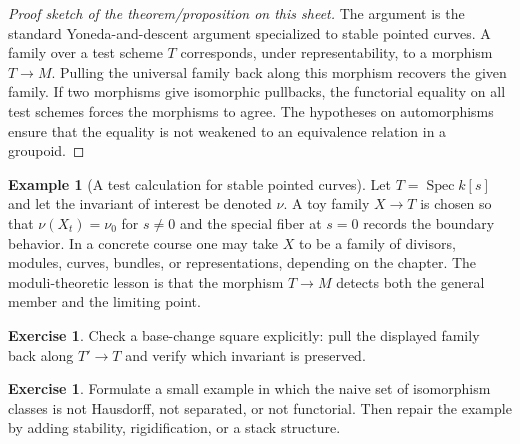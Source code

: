\documentclass[11pt]{amsart}
\theoremstyle{definition}
\newtheorem{example}[theorem]{Example}
\newtheorem{exercise}[theorem]{Exercise}
\newcommand{\Spec}{\operatorname{Spec}}
\begin{document}
\begin{proof}[Proof sketch of the theorem/proposition on this sheet]
The argument is the standard Yoneda-and-descent argument specialized to stable pointed curves.  A family over a test scheme $T$ corresponds, under representability, to a morphism $T\to M$.  Pulling the universal family back along this morphism recovers the given family.  If two morphisms give isomorphic pullbacks, the functorial equality on all test schemes forces the morphisms to agree.  The hypotheses on automorphisms ensure that the equality is not weakened to an equivalence relation in a groupoid.
\end{proof}
\begin{example}[A test calculation for stable pointed curves]
Let $T=\Spec k[s]$ and let the invariant of interest be denoted $\nu$.  A toy family $X\to T$ is chosen so that $\nu(X_t)=\nu_0$ for $s\ne0$ and the special fiber at $s=0$ records the boundary behavior.  In a concrete course one may take $X$ to be a family of divisors, modules, curves, bundles, or representations, depending on the chapter.  The moduli-theoretic lesson is that the morphism $T\to M$ detects both the general member and the limiting point.
\end{example}
\begin{exercise}
Check a base-change square explicitly: pull the displayed family back along $T\prime\to T$ and verify which invariant is preserved.
\end{exercise}
\begin{exercise}
Formulate a small example in which the naive set of isomorphism classes is not Hausdorff, not separated, or not functorial.  Then repair the example by adding stability, rigidification, or a stack structure.
\end{exercise}
\clearpage
\end{document}
